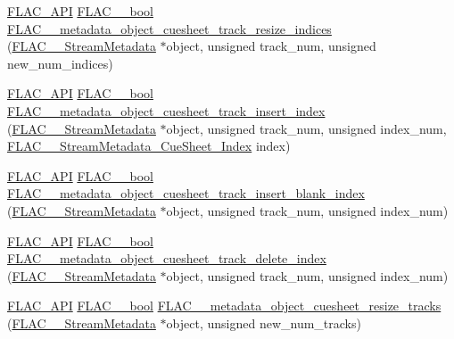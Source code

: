 \begin{DoxyCompactItemize}
\item 
\hyperlink{group__flac__export_ga56ca07df8a23310707732b1c0007d6f5}{F\+L\+A\+C\+\_\+\+A\+PI} \hyperlink{ordinals_8h_a95103469f1cbd78b8cf250194985b34e}{F\+L\+A\+C\+\_\+\+\_\+bool} \hyperlink{group__flac__metadata__object_ga57dfba89ba704574bde4e3fcd925d473}{F\+L\+A\+C\+\_\+\+\_\+metadata\+\_\+object\+\_\+cuesheet\+\_\+track\+\_\+resize\+\_\+indices} (\hyperlink{struct_f_l_a_c_____stream_metadata}{F\+L\+A\+C\+\_\+\+\_\+\+Stream\+Metadata} $\ast$object, unsigned track\+\_\+num, unsigned new\+\_\+num\+\_\+indices)
\item 
\hyperlink{group__flac__export_ga56ca07df8a23310707732b1c0007d6f5}{F\+L\+A\+C\+\_\+\+A\+PI} \hyperlink{ordinals_8h_a95103469f1cbd78b8cf250194985b34e}{F\+L\+A\+C\+\_\+\+\_\+bool} \hyperlink{group__flac__metadata__object_ga2f8c5d80c409eff5ebd53ccd0c6f0984}{F\+L\+A\+C\+\_\+\+\_\+metadata\+\_\+object\+\_\+cuesheet\+\_\+track\+\_\+insert\+\_\+index} (\hyperlink{struct_f_l_a_c_____stream_metadata}{F\+L\+A\+C\+\_\+\+\_\+\+Stream\+Metadata} $\ast$object, unsigned track\+\_\+num, unsigned index\+\_\+num, \hyperlink{struct_f_l_a_c_____stream_metadata___cue_sheet___index}{F\+L\+A\+C\+\_\+\+\_\+\+Stream\+Metadata\+\_\+\+Cue\+Sheet\+\_\+\+Index} index)
\item 
\hyperlink{group__flac__export_ga56ca07df8a23310707732b1c0007d6f5}{F\+L\+A\+C\+\_\+\+A\+PI} \hyperlink{ordinals_8h_a95103469f1cbd78b8cf250194985b34e}{F\+L\+A\+C\+\_\+\+\_\+bool} \hyperlink{group__flac__metadata__object_gaa1401ea99e4dc61d3eb034aed7d99602}{F\+L\+A\+C\+\_\+\+\_\+metadata\+\_\+object\+\_\+cuesheet\+\_\+track\+\_\+insert\+\_\+blank\+\_\+index} (\hyperlink{struct_f_l_a_c_____stream_metadata}{F\+L\+A\+C\+\_\+\+\_\+\+Stream\+Metadata} $\ast$object, unsigned track\+\_\+num, unsigned index\+\_\+num)
\item 
\hyperlink{group__flac__export_ga56ca07df8a23310707732b1c0007d6f5}{F\+L\+A\+C\+\_\+\+A\+PI} \hyperlink{ordinals_8h_a95103469f1cbd78b8cf250194985b34e}{F\+L\+A\+C\+\_\+\+\_\+bool} \hyperlink{group__flac__metadata__object_ga9cba3429dcc863714ceb1de6952c4737}{F\+L\+A\+C\+\_\+\+\_\+metadata\+\_\+object\+\_\+cuesheet\+\_\+track\+\_\+delete\+\_\+index} (\hyperlink{struct_f_l_a_c_____stream_metadata}{F\+L\+A\+C\+\_\+\+\_\+\+Stream\+Metadata} $\ast$object, unsigned track\+\_\+num, unsigned index\+\_\+num)
\item 
\hyperlink{group__flac__export_ga56ca07df8a23310707732b1c0007d6f5}{F\+L\+A\+C\+\_\+\+A\+PI} \hyperlink{ordinals_8h_a95103469f1cbd78b8cf250194985b34e}{F\+L\+A\+C\+\_\+\+\_\+bool} \hyperlink{group__flac__metadata__object_gafb0e09fdcfb08c466ceb1f6bca961177}{F\+L\+A\+C\+\_\+\+\_\+metadata\+\_\+object\+\_\+cuesheet\+\_\+resize\+\_\+tracks} (\hyperlink{struct_f_l_a_c_____stream_metadata}{F\+L\+A\+C\+\_\+\+\_\+\+Stream\+Metadata} $\ast$object, unsigned new\+\_\+num\+\_\+tracks)

\end{DoxyCompactItemize}
